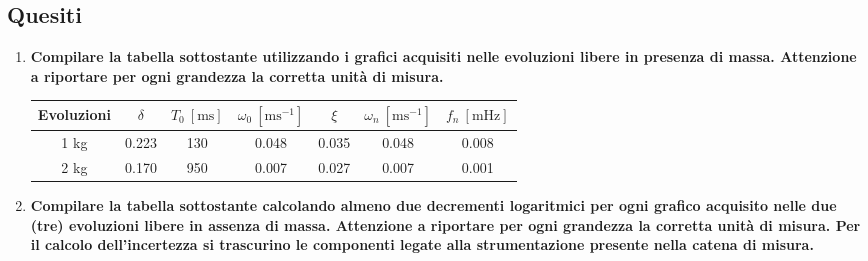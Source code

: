 \documentclass[a4paper, 12pt, twoside]{report}
\newcommand{\ra}[1]{\renewcommand{\arraystretch}{#1}} %
\begin{document}
\newpage	 	

	 	\subsection{Quesiti}
	 	\begin{enumerate}
	 		\item \textbf{Compilare la tabella sottostante utilizzando i grafici acquisiti nelle evoluzioni libere in presenza di massa. Attenzione a riportare per ogni grandezza la corretta unità di misura.}
	 		
	 		\begin{table}[H]
	 			\centering
	 			\ra{1.3}
	 			\label{tab:title6} 
	 			\begin{tabular}{ccccccc}
	 				\toprule
	 				\textbf{Evoluzioni}  &  $\delta$ &  $ T_0~[\text{ms}] $ &  $\omega_0~[\text{ms}^{-1}]$&  $\xi$ &  $\omega_n~[\text{ms}^{-1}]$&  $f_n~[\text{mHz}]$ \\ \midrule
	 				1 kg        & 0.223     & 130                  & 0.048                       & 0.035  & 0.048                       & 0.008              \\ 
	 				2 kg        & 0.170     & 950                  & 0.007                       & 0.027  & 0.007                       & 0.001              \\ \bottomrule
	 			\end{tabular}
	 		\end{table}
% 		
 		
 		\item \textbf{Compilare la tabella sottostante calcolando almeno due decrementi logaritmici per ogni grafico acquisito nelle due (tre) evoluzioni libere in assenza di massa. Attenzione a riportare per ogni grandezza la corretta unità di misura. Per il calcolo dell’incertezza si trascurino le componenti legate alla strumentazione presente nella catena di misura.}
 		

\end{enumerate}
\end{document}
